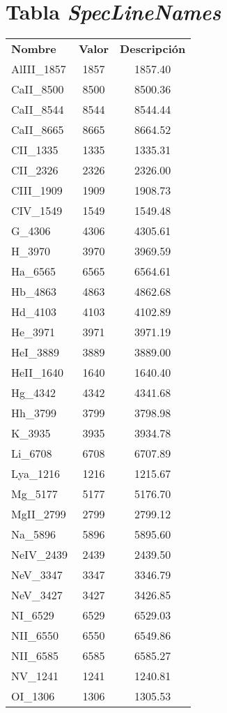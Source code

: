 \documentclass[upright, contnum]{umemoria}
\begin{document}
\chapter{Tabla \textit{SpecLineNames}}
\begin{longtable}{l c c}
\label{tab:spec_line_names}
\textbf{Nombre} & \textbf{Valor} & \textbf{Descripción} \\
AlIII\_1857 & 1857 & 1857.40 \\
CaII\_8500 & 8500 & 8500.36 \\
CaII\_8544 & 8544 & 8544.44 \\
CaII\_8665 & 8665 & 8664.52 \\
CII\_1335 & 1335 & 1335.31 \\
CII\_2326 & 2326 & 2326.00 \\
CIII\_1909 & 1909 & 1908.73 \\
CIV\_1549 & 1549 & 1549.48 \\
G\_4306 & 4306 & 4305.61 \\
H\_3970 & 3970 & 3969.59 \\
Ha\_6565 & 6565 & 6564.61 \\
Hb\_4863 & 4863 & 4862.68 \\
Hd\_4103 & 4103 & 4102.89 \\
He\_3971 & 3971 & 3971.19 \\
HeI\_3889 & 3889 & 3889.00 \\
HeII\_1640 & 1640 & 1640.40 \\
Hg\_4342 & 4342 & 4341.68 \\
Hh\_3799 & 3799 & 3798.98 \\
K\_3935 & 3935 & 3934.78 \\
Li\_6708 & 6708 & 6707.89 \\
Lya\_1216 & 1216 & 1215.67 \\
Mg\_5177 & 5177 & 5176.70 \\
MgII\_2799 & 2799 & 2799.12 \\
Na\_5896 & 5896 & 5895.60 \\
NeIV\_2439 & 2439 & 2439.50 \\
NeV\_3347 & 3347 & 3346.79 \\
NeV\_3427 & 3427 & 3426.85 \\
NI\_6529 & 6529 & 6529.03 \\
NII\_6550 & 6550 & 6549.86 \\
NII\_6585 & 6585 & 6585.27 \\
NV\_1241 & 1241 & 1240.81 \\
OI\_1306 & 1306 & 1305.53 \\

\end{longtable}
\end{document}
